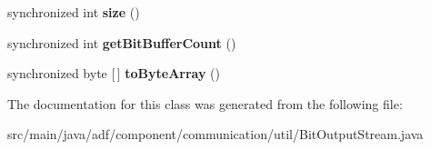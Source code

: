 \begin{DoxyCompactItemize}
\item 
\hypertarget{classadf_1_1component_1_1communication_1_1util_1_1BitOutputStream_a6e40fa252db62c2c0e3cac9d0e1ca361}{}\label{classadf_1_1component_1_1communication_1_1util_1_1BitOutputStream_a6e40fa252db62c2c0e3cac9d0e1ca361} 
synchronized int {\bfseries size} ()
\item 
\hypertarget{classadf_1_1component_1_1communication_1_1util_1_1BitOutputStream_a87ce9be63be29582ee8f752ecc8e5e29}{}\label{classadf_1_1component_1_1communication_1_1util_1_1BitOutputStream_a87ce9be63be29582ee8f752ecc8e5e29} 
synchronized int {\bfseries get\+Bit\+Buffer\+Count} ()
\item 
\hypertarget{classadf_1_1component_1_1communication_1_1util_1_1BitOutputStream_ad39fb96d909ec14a93741479dd43934f}{}\label{classadf_1_1component_1_1communication_1_1util_1_1BitOutputStream_ad39fb96d909ec14a93741479dd43934f} 
synchronized byte \mbox{[}$\,$\mbox{]} {\bfseries to\+Byte\+Array} ()
\end{DoxyCompactItemize}


The documentation for this class was generated from the following file\+:\begin{DoxyCompactItemize}
\item 
src/main/java/adf/component/communication/util/Bit\+Output\+Stream.\+java\end{DoxyCompactItemize}
